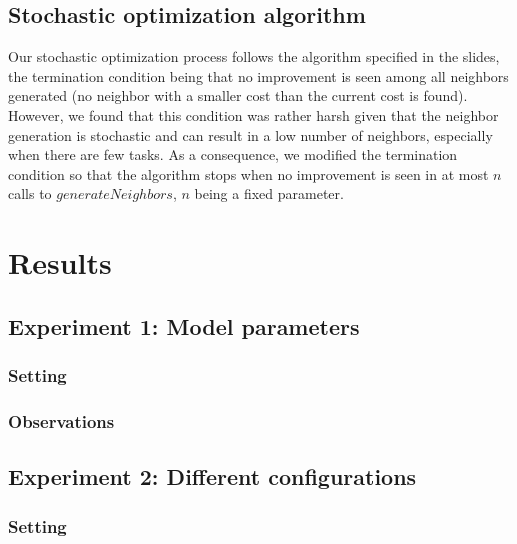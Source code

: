 \documentclass[11pt]{article}
\begin{document}
\subsection{Stochastic optimization algorithm}
Our stochastic optimization process follows the algorithm specified in the slides, the termination condition being that no improvement is seen among all neighbors generated (no neighbor with a smaller cost than the current cost is found). However, we found that this condition was rather harsh given that the neighbor generation is stochastic and can result in a low number of neighbors, especially when there are few tasks. As a consequence, we modified the termination condition so that the algorithm stops when no improvement is seen in at most $n$ calls to $generateNeighbors$, $n$ being a fixed parameter. 

\section{Results}

\subsection{Experiment 1: Model parameters}

\subsubsection{Setting}

\subsubsection{Observations}

\subsection{Experiment 2: Different configurations}

\subsubsection{Setting}
\end{document}
